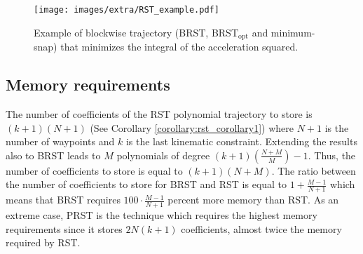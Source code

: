 \begin{figure}
\texttt{[image: images/extra/RST\_example.pdf]}
\centering
\vspace{-0.1em}
\caption{Example of blockwise trajectory (BRST, BRST$_{\text{opt}}$ and minimum-snap) that minimizes the integral of the acceleration squared.}
\vspace{-1.0em}
\label{fig:rst_example1}
\end{figure}

\subsection{Memory requirements}
\label{subsec:rst_time}
The number of coefficients of the RST polynomial trajectory to store is $(k+1)(N+1)$ (See Corollary \ref{corollary:rst_corollary1}) where $N+1$ is the number of waypoints and $k$ is the last kinematic constraint. Extending the results also to BRST leads to $M$ polynomials of degree $(k+1)(\frac{N+M}{M})-1$. Thus, the number of coefficients to store is equal to $(k+1)(N+M)$. The ratio between the number of coefficients to store for BRST and RST is equal to $1+\frac{M-1}{N+1}$ which means that BRST requires $100\cdot \frac{M-1}{N+1}$ percent more memory than RST. As an extreme case, PRST is the technique which requires the highest memory requirements since it stores $2N(k+1)$ coefficients, almost twice the memory required by RST.

